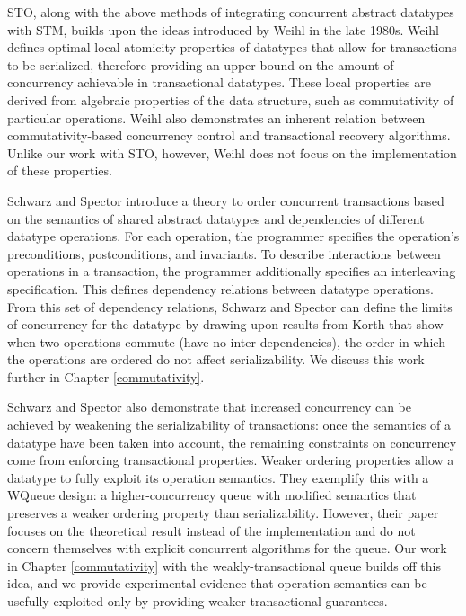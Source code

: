 STO, along with the above methods of integrating concurrent abstract datatypes with STM, builds upon the ideas introduced by Weihl in the late 1980s\cite{weihl}. Weihl defines optimal local atomicity properties of datatypes that allow for transactions to be serialized, therefore providing an upper bound on the amount of concurrency achievable in transactional datatypes. These local properties are derived from algebraic properties of the data structure, such as commutativity of particular operations. Weihl also demonstrates an inherent relation between commutativity-based concurrency control and transactional recovery algorithms. Unlike our work with STO, however, Weihl does not focus on the implementation of these properties.

Schwarz and Spector\cite{schwarz} introduce a theory to order concurrent transactions based on the semantics of shared abstract datatypes and dependencies of different datatype operations. For each operation, the programmer specifies the operation's preconditions, postconditions, and invariants. To describe interactions between operations in a transaction, the programmer additionally specifies an interleaving specification. This defines dependency relations between datatype operations. From this set of dependency relations, Schwarz and Spector can define the limits of concurrency for the datatype by drawing upon results from Korth\cite{korth} that show when two operations commute (have no inter-dependencies), the order in which the operations are ordered do not affect serializability. We discuss this work further in Chapter \ref{commutativity}. 

Schwarz and Spector also demonstrate that increased concurrency can be achieved by weakening the serializability of transactions: once the semantics of a datatype have been taken into account, the remaining constraints on concurrency come from enforcing transactional properties\cite{kung}. Weaker ordering properties allow a datatype to fully exploit its operation semantics. They exemplify this with a WQueue design: a higher-concurrency queue with modified semantics that preserves a weaker ordering property than serializability. However, their paper focuses on the theoretical result instead of the implementation and do not concern themselves with explicit concurrent algorithms for the queue. Our work in Chapter \ref{commutativity} with the weakly-transactional queue builds off this idea, and we provide experimental evidence that operation semantics can be usefully exploited only by providing weaker transactional guarantees.

